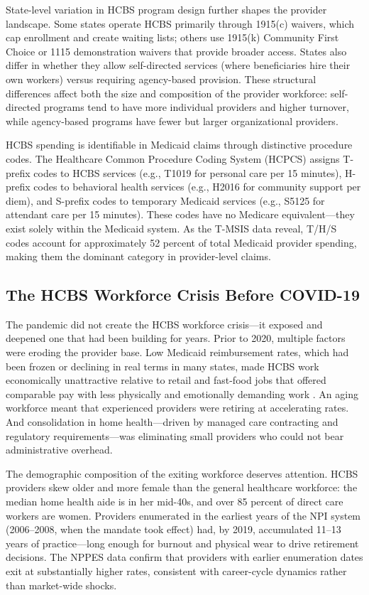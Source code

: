 \documentclass[12pt]{article}
\begin{document}
State-level variation in HCBS program design further shapes the provider landscape. Some states operate HCBS primarily through 1915(c) waivers, which cap enrollment and create waiting lists; others use 1915(k) Community First Choice or 1115 demonstration waivers that provide broader access. States also differ in whether they allow self-directed services (where beneficiaries hire their own workers) versus requiring agency-based provision. These structural differences affect both the size and composition of the provider workforce: self-directed programs tend to have more individual providers and higher turnover, while agency-based programs have fewer but larger organizational providers.

HCBS spending is identifiable in Medicaid claims through distinctive procedure codes. The Healthcare Common Procedure Coding System (HCPCS) assigns T-prefix codes to HCBS services (e.g., T1019 for personal care per 15 minutes), H-prefix codes to behavioral health services (e.g., H2016 for community support per diem), and S-prefix codes to temporary Medicaid services (e.g., S5125 for attendant care per 15 minutes). These codes have no Medicare equivalent---they exist solely within the Medicaid system. As the T-MSIS data reveal, T/H/S codes account for approximately 52 percent of total Medicaid provider spending, making them the dominant category in provider-level claims.

\subsection{The HCBS Workforce Crisis Before COVID-19}

The pandemic did not create the HCBS workforce crisis---it exposed and deepened one that had been building for years. Prior to 2020, multiple factors were eroding the provider base. Low Medicaid reimbursement rates, which had been frozen or declining in real terms in many states, made HCBS work economically unattractive relative to retail and fast-food jobs that offered comparable pay with less physically and emotionally demanding work \citep{scales2020hcbs}. An aging workforce meant that experienced providers were retiring at accelerating rates. And consolidation in home health---driven by managed care contracting and regulatory requirements---was eliminating small providers who could not bear administrative overhead.

The demographic composition of the exiting workforce deserves attention. HCBS providers skew older and more female than the general healthcare workforce: the median home health aide is in her mid-40s, and over 85 percent of direct care workers are women. Providers enumerated in the earliest years of the NPI system (2006--2008, when the mandate took effect) had, by 2019, accumulated 11--13 years of practice---long enough for burnout and physical wear to drive retirement decisions. The NPPES data confirm that providers with earlier enumeration dates exit at substantially higher rates, consistent with career-cycle dynamics rather than market-wide shocks.
\end{document}
